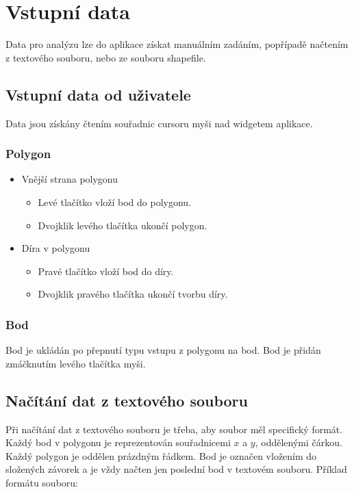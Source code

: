 \section{Vstupní data}
Data pro analýzu lze do aplikace získat manuálním zadáním, popřípadě načtením z textového souboru, nebo ze souboru shapefile.
\subsection{Vstupní data od uživatele}
Data jsou získány čtením souřadnic cursoru myši nad widgetem
aplikace.
\subsubsection{Polygon}
\begin{itemize}
    \item Vnější strana polygonu
    \begin{itemize}
        \item Levé tlačítko vloží bod do polygonu.
        \item Dvojklik levého tlačítka ukončí polygon.
    \end{itemize}
    \item Díra v polygonu
    \begin{itemize}
        \item Pravé tlačítko vloží bod do díry.
        \item Dvojklik pravého tlačítka ukončí tvorbu díry.
    \end{itemize}
\end{itemize}

\subsubsection{Bod}
Bod je ukládán po přepnutí typu vstupu z polygonu na bod. Bod je přidán zmáčknutím levého tlačítka myši.

\subsection{Načítání dat z textového souboru}
Při načítání dat z textového souboru je třeba, aby soubor měl specifický formát. Každý bod v polygonu je reprezentován souřadnicemi \( x \) a \( y \), oddělenými čárkou. Každý polygon je oddělen prázdným řádkem. Bod je označen vložením do složených závorek a je vždy načten jen poslední bod v textovém souboru.
Příklad formátu souboru:

